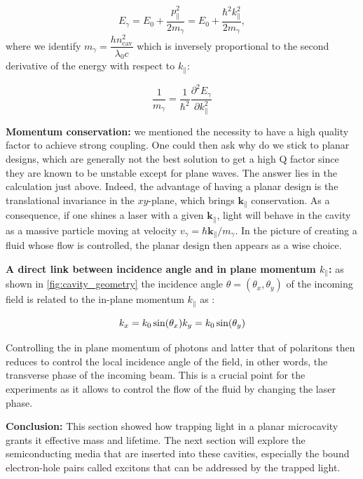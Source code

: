 \begin{equation}
    E_\gamma = E_0 + \dfrac{p_{\parallel}^2}{2m_{\gamma}} =E_0 + \dfrac{\hbar^2 k_{\parallel}^2}{2m_{\gamma}},
    \label{eq:photon_mass}
\end{equation}
where we identify $m_{\gamma} = \dfrac{h n_{\mathrm{cav}}^2}{\lambda_0 c}$ which is inversely proportional to the second derivative of the energy with respect to $k_{\parallel}$:

\begin{equation}
    \dfrac{1}{m_{\gamma}} = \dfrac{1}{\hbar^2}\dfrac{\partial^2 E_{\gamma}}{\partial k_{\parallel}^2}
    \label{eq:mass}
\end{equation}

\noindent\textbf{Momentum conservation:}
we mentioned the necessity to have a high quality factor to achieve strong coupling. One could then ask why do we stick to planar designs, which are generally not the best solution to get a high Q factor since they are known to be unstable except for plane waves. The answer lies in the calculation just above. Indeed, the advantage of having a planar design is the translational invariance in the $xy$-plane, which brings $\bm{k_{\parallel}}$ conservation. As a consequence, if one shines a laser with a given $\bm{k_{\parallel}}$, light will behave in the cavity as a massive particle moving at velocity $v_\gamma=\hbar \bm{k_{\parallel}}/m_\gamma$. In the picture of creating a fluid whose flow is controlled, the planar design then appears as a wise choice.

\bigskip\noindent

\noindent\textbf{A direct link between incidence angle and in plane momentum $k_{\parallel}$:}
as shown in \autoref{fig:cavity_geometry} the incidence angle $\theta= (\theta_x, \theta_y)$ of the incoming field is related to the in-plane momentum $k_{\parallel}$ as :

\begin{equation}
    k_{x} = k_0 \sin(\theta_x) \\
    k_{y} = k_0 \sin(\theta_y)
    \label{eq:kpar}
\end{equation}

Controlling the in plane momentum of photons and latter that of polaritons then reduces to control the local incidence angle of the field, in other words, the transverse phase of the incoming beam. This is a crucial point for the experiments as it allows to control the flow of the fluid by changing the laser phase.

\bigskip\noindent
\textbf{Conclusion:}
This section showed how trapping light in a planar microcavity grants it effective mass and lifetime. The next section will explore the semiconducting media that are inserted into these cavities, especially the bound electron-hole pairs called excitons that can be addressed by the trapped light.


